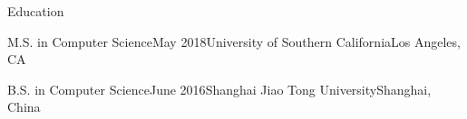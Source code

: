 \documentclass{resume} %
\begin{document}




\begin{rSection}{Education}

\begin{rEducation}{M.S. in Computer Science}{May 2018}{University of Southern California}{Los Angeles, CA}
\end{rEducation}

\begin{rEducation}{B.S. in Computer Science}{June 2016}{Shanghai Jiao Tong University}{Shanghai, China}
\end{rEducation}

\end{rSection}


%


%




\end{document}
